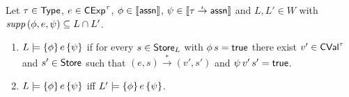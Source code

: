 \documentclass[12pt,a4paper]{report}
\newcommand{\CExp}{\sstyle{CExp}}
\newcommand{\CVal}{\sstyle{CVal}}
\begin{document}
\begin{lemma} \label{lemma:Total_correctness}
  Let $\tau\in\mathsf{Type}$, $e\in\CExp^\tau$, $\phi\in\llbracket\mathsf{assn}\rrbracket$, $\psi\in\llbracket\tau\stackrel{_t}{\to}\mathsf{assn}\rrbracket$
  and $L,L'\in W$ with $\mathit{supp}\,(\phi,e,\psi) \subseteq L \cap L'$.
  \begin{enumerate}
    \item $L\models\{\phi\}\,e\,\{\psi\}$ if for every $s \in \mathsf{Store}_L$ with $\phi\,s=\mathsf{true}$ there exist $v'\in\CVal^\tau$ and 
          $s'\in\mathsf{Store}$ such that $(e,s) \xrightarrow* (v',s')$ and $\psi\,v'\,s'=\mathsf{true}$.

    \item $L\models\{\phi\}\,e\,\{\psi\}$ iff $L'\models\{\phi\}\,e\,\{\psi\}$.
  \end{enumerate}
\end{lemma}
\end{document}
